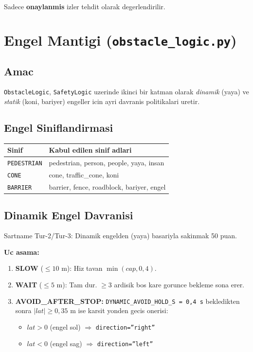 \documentclass[a4paper,12pt]{article}
\begin{document}
Sadece \textbf{onaylanmis} izler tehdit olarak degerlendirilir.

\section{Engel Mantigi (\texttt{obstacle\_logic.py})}

\subsection{Amac}

\texttt{ObstacleLogic}, \texttt{SafetyLogic} uzerinde ikinci bir katman olarak
\emph{dinamik} (yaya) ve \emph{statik} (koni, bariyer) engeller icin ayri
davranis politikalari uretir.

\subsection{Engel Siniflandirmasi}

\begin{center}
\begin{tabular}{ll}
  \toprule
  Sinif               & Kabul edilen sinif adlari\\
  \midrule
  \texttt{PEDESTRIAN} & pedestrian, person, people, yaya, insan\\
  \texttt{CONE}       & cone, traffic\_cone, koni\\
  \texttt{BARRIER}    & barrier, fence, roadblock, bariyer, engel\\
  \bottomrule
\end{tabular}
\end{center}

\subsection{Dinamik Engel Davranisi}

\begin{specbox}
Sartname Tur-2/Tur-3: Dinamik engelden (yaya) basariyla sakinmak 50 puan.
\end{specbox}

\textbf{Uc asama:}
\begin{enumerate}
  \item \textbf{SLOW} ($\leq 10$ m): Hiz tavan $\min(cap, 0{,}4)$.
  \item \textbf{WAIT} ($\leq 5$ m): Tam dur. $\geq 3$ ardisik bos kare
        gorunce bekleme sona erer.
  \item \textbf{AVOID\_AFTER\_STOP:} \texttt{DYNAMIC\_AVOID\_HOLD\_S = 0{,}4 s}
        bekledikten sonra $|lat| \geq 0{,}35$ m ise karsit yonden gecis onerisi:
        \begin{itemize}
          \item $lat > 0$ (engel sol) $\Rightarrow$ \texttt{direction=''right''}
          \item $lat < 0$ (engel sag) $\Rightarrow$ \texttt{direction=''left''}
        \end{itemize}
\end{enumerate}
\end{document}
